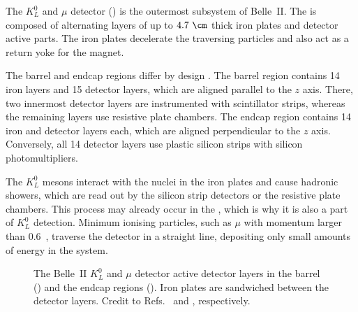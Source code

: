 The $K_L^0$ and $\mu$ detector (\KLM) \cite{Aushev:2014spa} is the outermost subsystem of Belle~II.
The \KLM is composed of alternating layers of up to $4.7~\cm$ thick iron plates and detector active parts.
The iron plates decelerate the traversing particles and also act as a return yoke for the magnet.

The barrel and endcap regions differ by design \cite{Krohn:317929}.
The barrel region contains 14 iron layers and 15 detector layers, which are aligned parallel to the $z$ axis.
There, two innermost detector layers are instrumented with scintillator strips, 
whereas the remaining layers use resistive plate chambers.
The endcap region contains 14 iron and detector layers each, which are aligned perpendicular to the $z$ axis.
Conversely, all 14 detector layers use plastic silicon strips with silicon photomultipliers.

The $K_L^0$ mesons interact with the nuclei in the iron plates and cause hadronic showers, 
which are read out by the silicon strip detectors or the resistive plate chambers.
This process may already occur in the \ECL, which is why it is also a part of $K_L^0$ detection.
Minimum ionising particles, such as $\mu$ with momentum larger than 0.6~\gevc, traverse the detector in a straight line, 
depositing only small amounts of energy in the system.

\begin{figure}[htbp!]
    \caption{\label{fig:klm}
        The Belle~II $K_L^0$ and $\mu$ detector active detector layers in the barrel () and the endcap regions ().
        Iron plates are sandwiched between the detector layers.
        Credit to Refs.~\cite{Krohn:317929} and \cite{Aushev:2014spa}, respectively.
    }
\end{figure}

